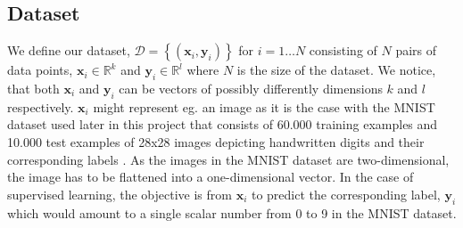 \documentclass[a4paper,11pt]{article}
\begin{document}
\subsection{Dataset}
We define our dataset, $\mathcal{D} = \left\{(\mathbf{x}_i, \mathbf{y}_i)\right\}$ for $i = 1 \ldots N$ consisting of $N$ pairs of data points, $\mathbf{x}_i \in \mathbb{R}^k$ and $\mathbf{y}_i \in \mathbb{R}^l$ where $N$ is the size of the dataset. We notice, that both $\mathbf{x}_i$ and $\mathbf{y}_i$ can be vectors of possibly differently dimensions $k$ and $l$ respectively. $\mathbf{x}_i$ might represent eg. an image as it is the case with the MNIST dataset used later in this project that consists of 60.000 training examples and 10.000 test examples of 28x28 images depicting handwritten digits and their corresponding labels \cite{mnist}. As the images in the MNIST dataset are two-dimensional, the image has to be flattened into a one-dimensional vector. In the case of supervised learning, the objective is from $\mathbf{x}_i$ to predict the corresponding label, $\mathbf{y}_i$ which would amount to a single scalar number from 0 to 9 in the MNIST dataset. 
\end{document}
